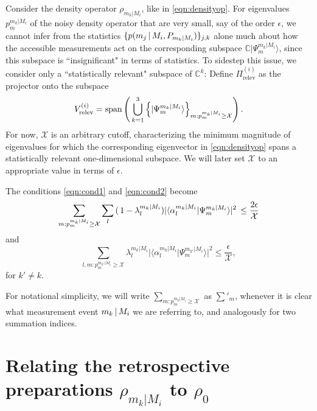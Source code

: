 Consider the density operator $\rho_{m_k\vert M_i}$, like in \ref{eqn:densityop}. For eigenvalues $p_m^{m_k\vert M_i}$ of the noisy density operator that are very small, say of the order $\epsilon$, we cannot infer from the statistics $\{p(m_j\thinspace\vert\thinspace M_i, P_{m_k\vert M_i})\}_{j,k}$ alone much about how the accessible measurements act on the corresponding subspace $\mathbb{C}\vert \Psi_m^{m_k\vert M_i}\rangle$, since this subspace is ``insignificant" in terms of statistics. To sidestep this issue, we consider only a ``statistically relevant" subspace of $\mathbb{C}^k$:
Define $\Pi_{\text{relev}}^{(i)}$ as the projector onto the subspace 
\begin{equation}
\label{eqn:relevsubspace}
V_{\text{relev}}^{(i)}=\operatorname{span}\left(\thinspace\bigcup_{k=1}^3\left\{\vert \Psi_m^{m_k\vert M_i}\rangle\right\}_{m:p_m^{m_k\vert M_i}\geq\mathcal{X}}\right).
\end{equation}
For now, $\mathcal{X}$ is an arbitrary cutoff, characterizing the minimum magnitude of eigenvalues for which the corresponding eigenvector in \ref{eqn:densityop} spans a statistically relevant one-dimensional subspace. We will later set $\mathcal{X}$ to an appropriate value in terms of $\epsilon$. 

The conditions \ref{eqn:cond1} and \ref{eqn:cond2} become
\begin{equation}
\label{eqn:cond1new}
\sum_{m:p_m^{m_k\vert M_i}\geq \mathcal{X}} \sum_l \,(\thinspace 1- \lambda_l^{m_k\vert M_i}) \vert \langle \alpha_l^{m_k\vert M_i}\vert \Psi_m^{m_k\vert M_i} \rangle \vert^2\thinspace \leq \frac{2\epsilon}{\mathcal{X}}
\end{equation}
and
\begin{equation}
\label{eqn:cond2new}
\sum_{l,m:p_m^{m_{k'}\vert M_i}\geq \mathcal{X}} \lambda_l^{m_k\vert M_i} \vert \langle \alpha_l^{m_k\vert M_i}\vert \Psi_m^{m_{k'}\vert M_i} \rangle \vert^2\leq \frac{\epsilon}{\mathcal{X}},
\end{equation}
for $k'\neq k$.

For notational simplicity, we will write $\sum_{m:p_m^{m_k\vert M_i}\geq \mathcal{X}}$ as $\sum'_m$, whenever it is clear what measurement event $m_k\thinspace\vert\thinspace M_i$ we are referring to, and analogously for two summation indices.

\section{Relating the retrospective preparations $\rho_{m_k \vert M_i}$ to $\rho_0$}

